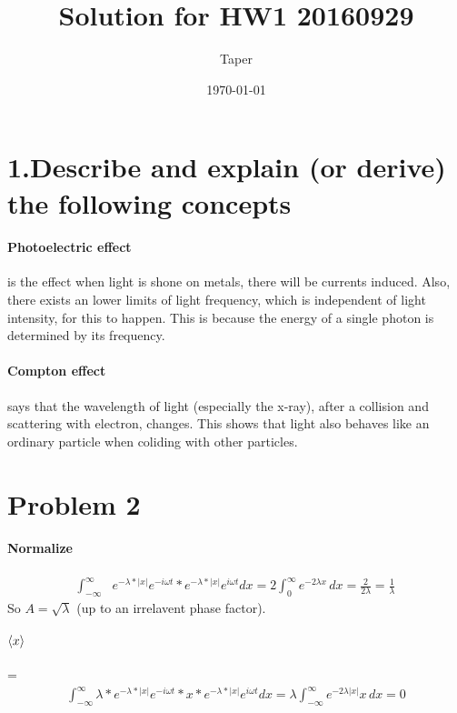 \documentclass{article}
\title{Solution for HW1 20160929}
\date{\today}
\author{Taper}
\numberwithin{equation}{subsection} %
\theoremstyle{definition}
\begin{document}
\maketitle
{}
\section{1.Describe and explain (or derive) the following concepts}

\paragraph{Photoelectric effect} is the effect when light is shone on
metals, there will be currents induced. Also, there exists an lower limits
of light frequency, which is independent of light intensity, for this to
happen. This is because the energy of a single photon is determined by its
frequency.

\paragraph{Compton effect} says that the wavelength of light (especially
the x-ray), after a collision and scattering with electron, changes. This
shows that light also behaves like an ordinary particle when coliding with
other particles.

\section{Problem 2}
\paragraph{Normalize}
\begin{align}
    \int_{-\infty }^{\infty }
      &e^{-\lambda *|x|}e^{-i\omega t}*e^{-\lambda *|x|}e^{i\omega t}dx
      =2 \int_0^{\infty } e^{-2 \lambda x} \, dx
      =\frac{2}{2 \lambda }=\frac{1}{\lambda }
\end{align}
So $A=\sqrt{\lambda}$ (up to an irrelavent phase factor).
\paragraph{$\braket{x}$}=
\begin{align}
    \int _{-\infty }^{\infty }\lambda *e^{-\lambda *|x|}
        e^{-i\omega t}*x*e^{-\lambda *|x|}e^{i\omega t}dx
    =\lambda \int _{-\infty }^{\infty }e^{-2 \lambda |x|}x\, dx=0
\end{align}
\end{document}

